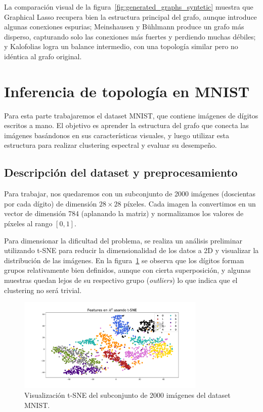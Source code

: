 \documentclass{article}
\begin{document}
La comparación visual de la figura~\ref{fig:generated_graphs_syntetic} muestra que Graphical Lasso recupera bien la estructura principal del grafo, aunque introduce algunas conexiones espurias; Meinshausen y Bühlmann produce un grafo más disperso, capturando solo las conexiones más fuertes y perdiendo muchas débiles; y Kalofolias logra un balance intermedio, con una topología similar pero no idéntica al grafo original. 


\section{Inferencia de topología en MNIST}
\label{sec:mnist}
Para esta parte trabajaremos el dataset MNIST, que contiene imágenes de dígitos escritos a mano. El objetivo es aprender la estructura del grafo que conecta las imágenes basándonos en sus características visuales, y luego utilizar esta estructura para realizar clustering espectral y evaluar su desempeño.

\subsection{Descripción del dataset y preprocesamiento}
Para trabajar, nos quedaremos con un subconjunto de 2000 imágenes (doscientas por cada dígito) de dimensión $28 \times 28$ píxeles. Cada imagen la convertimos en un vector de dimensión 784 (aplanando la matriz) y normalizamos los valores de píxeles al rango $[0,1]$. 

Para dimensionar la dificultad del problema, se realiza un análisis preliminar utilizando t-SNE para reducir la dimensionalidad de los datos a 2D y visualizar la distribución de las imágenes. En la figura~\ref{fig:tsne_mnist} se observa que los dígitos forman grupos relativamente bien definidos, aunque con cierta superposición, y algunas muestras quedan lejos de su respectivo grupo (\textit{outliers}) lo que indica que el clustering no será trivial.

\begin{figure}[htb]
    \centering
    \includegraphics[width=0.8\textwidth]{imagenes/mnist/tsne_mnist.pdf}
    \caption{Visualización t-SNE del subconjunto de 2000 imágenes del dataset MNIST.}
    \label{fig:tsne_mnist}
\end{figure}   
\end{document}
